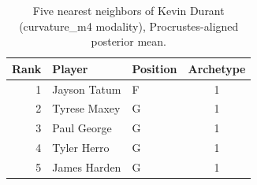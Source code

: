 \begin{table}[htbp]
  \centering\small
  \begin{tabular}{rllc}
    \toprule
    Rank & Player & Position & Archetype \\
    \midrule
    1 & Jayson Tatum & F & 1 \\
    2 & Tyrese Maxey & G & 1 \\
    3 & Paul George & G & 1 \\
    4 & Tyler Herro & G & 1 \\
    5 & James Harden & G & 1 \\
    \bottomrule
  \end{tabular}
  \caption{Five nearest neighbors of Kevin Durant (curvature_m4 modality), Procrustes-aligned posterior mean.}
  \label{tab:Kevin_Durant_neighbors_curvature_m4}
\end{table}

